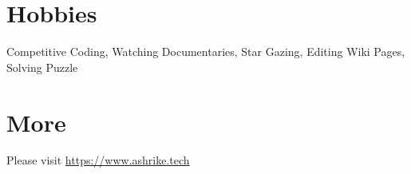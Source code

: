 \documentclass[margin, centered]{res}
\begin{document}
\begin{resume}
\begin{itemize}[leftmargin=*]
\end{itemize}



\section{Hobbies}
Competitive Coding, Watching Documentaries, Star Gazing, Editing Wiki Pages, Solving Puzzle

\section{More}
Please visit \href{https://www.ashrike.tech}{https://www.ashrike.tech}

\end{resume}
\end{document}
